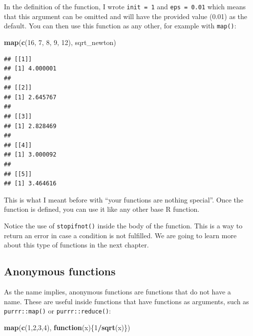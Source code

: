 \documentclass[]{gitbook}
\newenvironment{Shaded}{\begin{snugshade}}{\end{snugshade}}
\newcommand{\ControlFlowTok}[1]{\textcolor[rgb]{0.13,0.29,0.53}{\textbf{#1}}}
\newcommand{\DecValTok}[1]{\textcolor[rgb]{0.00,0.00,0.81}{#1}}
\newcommand{\KeywordTok}[1]{\textcolor[rgb]{0.13,0.29,0.53}{\textbf{#1}}}
\newcommand{\NormalTok}[1]{#1}
\newcommand{\OperatorTok}[1]{\textcolor[rgb]{0.81,0.36,0.00}{\textbf{#1}}}
\begin{document}
In the definition of the function, I wrote \texttt{init\ =\ 1} and \texttt{eps\ =\ 0.01} which means that this
argument can be omitted and will have the provided value (0.01) as the default. You can then use
this function as any other, for example with \texttt{map()}:

\begin{Shaded}
\begin{Highlighting}[]
\KeywordTok{map}\NormalTok{(}\KeywordTok{c}\NormalTok{(}\DecValTok{16}\NormalTok{, }\DecValTok{7}\NormalTok{, }\DecValTok{8}\NormalTok{, }\DecValTok{9}\NormalTok{, }\DecValTok{12}\NormalTok{), sqrt_newton)}
\end{Highlighting}
\end{Shaded}

\begin{verbatim}
## [[1]]
## [1] 4.000001
## 
## [[2]]
## [1] 2.645767
## 
## [[3]]
## [1] 2.828469
## 
## [[4]]
## [1] 3.000092
## 
## [[5]]
## [1] 3.464616
\end{verbatim}

This is what I meant before with ``your functions are nothing special''. Once the function is
defined, you can use it like any other base R function.

Notice the use of \texttt{stopifnot()} inside the body of the function. This is a way to return an error
in case a condition is not fulfilled. We are going to learn more about this type of functions
in the next chapter.

\hypertarget{anonymous-functions}{%
\subsection{Anonymous functions}\label{anonymous-functions}}

As the name implies, anonymous functions are functions that do not have a name. These are useful inside
functions that have functions as arguments, such as \texttt{purrr::map()} or \texttt{purrr::reduce()}:

\begin{Shaded}
\begin{Highlighting}[]
\KeywordTok{map}\NormalTok{(}\KeywordTok{c}\NormalTok{(}\DecValTok{1}\NormalTok{,}\DecValTok{2}\NormalTok{,}\DecValTok{3}\NormalTok{,}\DecValTok{4}\NormalTok{), }\ControlFlowTok{function}\NormalTok{(x)\{}\DecValTok{1}\OperatorTok{/}\KeywordTok{sqrt}\NormalTok{(x)\})}
\end{Highlighting}
\end{Shaded}
\end{document}
